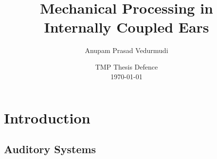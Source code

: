 \documentclass{beamer}
\title{\Large Mechanical Processing in Internally Coupled Ears}
\author{Anupam Prasad Vedurmudi}
\date{TMP Thesis Defence\\ \today}
\begin{document}
\begin{frame}[t]
 \titlepage
 

\end{frame}


\section{Introduction}
\subsection{Auditory Systems}
\end{document}

